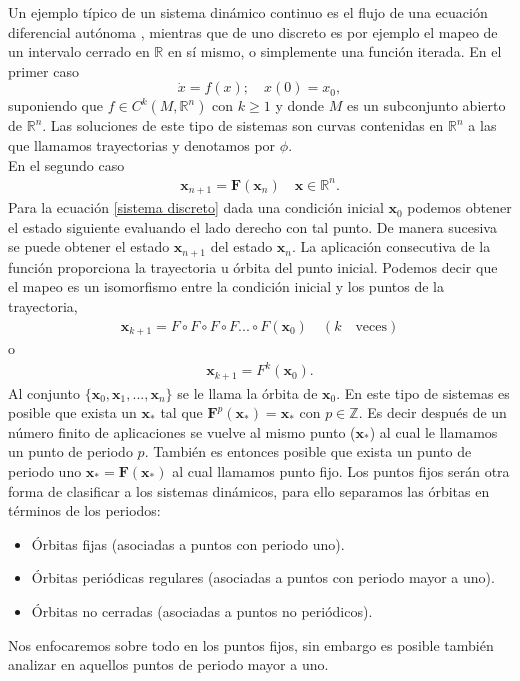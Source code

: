 Un ejemplo típico de un sistema dinámico continuo es el flujo de una ecuación diferencial autónoma , mientras que de uno discreto es por ejemplo el mapeo de un intervalo cerrado en $\mathbb{R}$ en sí mismo, o simplemente una función iterada. En el primer caso
\begin{equation}
\dot{x} =  f(x); \quad  
x(0)=x_{0} , \label{ec dif}
\end{equation}
suponiendo que $f \in C^{k}(M,\mathbb{R}^{n})$ con $k \geq 1$ y donde $M$ es un subconjunto abierto de $\mathbb{R}^{n}$. Las soluciones de este tipo de sistemas son curvas contenidas en $\mathbb{R}^{n}$ a las que llamamos trayectorias y denotamos por $\phi$.\\
En el segundo caso  
\begin{eqnarray}
\pmb x_{n+1}= \pmb F (\pmb x_{n}) \quad \pmb x\in \mathbb{R}^{n}. \label{sistema discreto}
\end{eqnarray}
Para la ecuación \ref{sistema discreto} dada una condición inicial $\pmb x_{0}$ podemos obtener el estado siguiente evaluando el lado derecho con tal punto. De manera sucesiva se puede obtener el estado $\pmb x_{n+1}$ del estado $\pmb x_{n}$. La aplicación consecutiva de la función proporciona la trayectoria u órbita del punto inicial. Podemos decir que el mapeo es un isomorfismo entre la condición inicial y los puntos de la trayectoria,
\begin{eqnarray*}
\pmb x_{k+1}=F\circ F \circ F \circ F ... \circ F (\pmb x_{0})\quad (k \quad \textrm{veces})
\end{eqnarray*}
o
\begin{eqnarray*}
\pmb x_{k+1} = F^{k}(\pmb x_{0}).
\end{eqnarray*}
Al conjunto $\lbrace \pmb x_{0},\pmb x_{1},...,\pmb x_{n} \rbrace$ se le llama la órbita de $\pmb x_{0}$.  En este tipo de sistemas es posible que exista un $\pmb x_{*}$ tal que $\mathbf{F}^{p}(\pmb x_{*})=\pmb x_{*}$ con $p \in \mathbb{Z}$. Es decir después de un número finito de aplicaciones se vuelve al mismo punto ($\pmb x_{*}$) al cual le llamamos un punto de periodo $p$. También es entonces posible  que exista un punto de periodo uno $\pmb x_{*}=\mathbf{F}(\pmb x_{*})$ al cual llamamos punto fijo. Los puntos fijos serán otra forma de clasificar a los sistemas dinámicos, para ello separamos las órbitas en términos de los periodos:

\begin{itemize}
\item  Órbitas fijas (asociadas a puntos con periodo uno).
\item Órbitas periódicas regulares (asociadas a puntos con periodo mayor a uno).
\item Órbitas no cerradas (asociadas a puntos no periódicos).
\end{itemize}
Nos enfocaremos sobre todo en los puntos fijos, sin embargo es posible también analizar en aquellos puntos de periodo mayor a uno.
